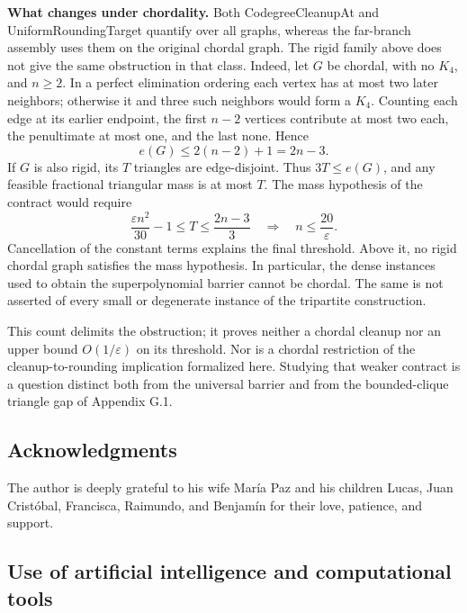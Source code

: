 \documentclass[english,11pt,a4paper]{article}
\newcounter{none}
\begin{document}
\textbf{What changes under chordality.} Both {\ttfamily\small CodegreeClea\discretionary{\hbox{\ensuremath{\hookrightarrow}}}{}{}nupAt} and {\ttfamily\small UniformRound\discretionary{\hbox{\ensuremath{\hookrightarrow}}}{}{}ingTarget} quantify over all graphs, whereas the far-branch assembly uses them on the original chordal graph. The rigid family above does not give the same obstruction in that class. Indeed, let \(G\) be chordal, with no \(K_4\), and \(n\ge2\). In a perfect elimination ordering each vertex has at most two later neighbors; otherwise it and three such neighbors would form a \(K_4\). Counting each edge at its earlier endpoint, the first \(n-2\) vertices contribute at most two each, the penultimate at most one, and the last none. Hence \[
e(G)\le2(n-2)+1=2n-3.
\tag{G.4}
\] If \(G\) is also rigid, its \(T\) triangles are edge-disjoint. Thus \(3T\le e(G)\), and any feasible fractional triangular mass is at most \(T\). The mass hypothesis of the contract would require \[
\frac{\varepsilon n^2}{30}-1
\le T\le\frac{2n-3}{3}
\quad\Longrightarrow\quad n\le\frac{20}{\varepsilon}.
\tag{G.5}
\] Cancellation of the constant terms explains the final threshold. Above it, no rigid chordal graph satisfies the mass hypothesis. In particular, the dense instances used to obtain the superpolynomial barrier cannot be chordal. The same is not asserted of every small or degenerate instance of the tripartite construction.

This count delimits the obstruction; it proves neither a chordal cleanup nor an upper bound \(O(1/\varepsilon)\) on its threshold. Nor is a chordal restriction of the cleanup-to-rounding implication formalized here. Studying that weaker contract is a question distinct both from the universal barrier and from the bounded-clique triangle gap of Appendix G.1.

\subsection{Acknowledgments}\label{acknowledgments}

The author is deeply grateful to his wife María Paz and his children Lucas, Juan Cristóbal, Francisca, Raimundo, and Benjamín for their love, patience, and support.

\subsection{Use of artificial intelligence and computational tools}\label{use-of-artificial-intelligence-and-computational-tools}
\end{document}
